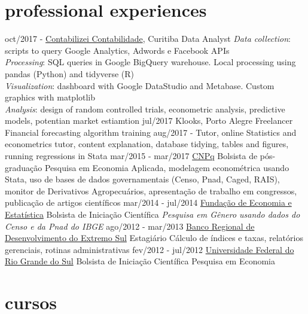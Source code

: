 \documentclass[]{friggeri-cv}
\begin{document}
\section{professional experiences}

\begin{entrylist}
  \entry
    {oct/2017 - }
    {\href{https://www.contabilizei.com.br}{Contabilizei Contabilidade}, Curitiba}
    {Data Analyst}
    {\emph{Data collection}: scripts to query Google Analytics, Adwords e Facebook APIs\\
     \emph{Processing}: SQL queries in Google BigQuery warehouse. Local processing using pandas (Python) and tidyverse (R) \\
     \emph{Visualization}: dashboard with Google DataStudio and Metabase. Custom graphics with matplotlib \\
     \emph{Analysis}: design of random controlled trials, econometric analysis, predictive models, potentian market estiamtion}
  \entry
    {jul/2017}
    {Klooks, Porto Alegre}
    {Freelancer}
    {Financial forecasting algorithm training}
  \entry
    {aug/2017 - }
    {Tutor, online}
    {}
    {Statistics and econometrics tutor, content explanation, database tidying, tables and figures, running regressions in Stata}
  \entry
    {mar/2015 - mar/2017}
    {\href{cnpq.br}{CNPq}}
    {Bolsista de pós-graduação}
    {Pesquisa em Economia Aplicada, modelagem econométrica usando Stata, uso de bases de dados governamentais (Censo, Pnad, Caged, RAIS), monitor de Derivativos Agropecuários, apresentação de trabalho em congressos, publicação de artigos científicos}
  \entry
    {mar/2014 - jul/2014}
    {\href{https://www.fee.rs.gov.br}{Fundação de Economia e Estatística}}
    {Bolsista de Iniciação Científica}
    {\emph{Pesquisa em Gênero usando dados do Censo e da Pnad do IBGE}}
  \entry
    {ago/2012 - mar/2013}
    {\href{http://www.brde.com.br}{Banco Regional de Desenvolvimento do Extremo Sul}}
    {Estagiário}
    {Cálculo de índices e taxas, relatórios gerenciais, rotinas administrativas}
  \entry
    {fev/2012 - jul/2012}
    {\href{http://www.ufrgs.br}{Universidade Federal do Rio Grande do Sul}}
    {Bolsista de Iniciação Científica}
    {Pesquisa em Economia}
\end{entrylist}

\section{cursos}
\end{document}
